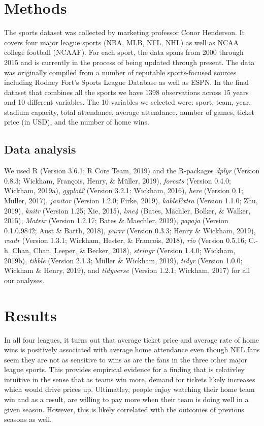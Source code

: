 \documentclass[man, fleqn, noextraspace,floatsintext]{apa6}
\begin{document}
\section{Methods}\label{methods}

The sports dataset was collected by marketing professor Conor Henderson.
It covers four major league sports (NBA, MLB, NFL, NHL) as well as NCAA
college football (NCAAF). For each sport, the data spans from 2000
through 2015 and is currently in the process of being updated through
present. The data was originally compiled from a number of reputable
sports-focused sources including Rodney Fort's Sports League Database as
well as ESPN. In the final dataset that combines all the sports we have
1398 observations across 15 years and 10 different variables. The 10
variables we selected were: sport, team, year, stadium capacity, total
attendance, average attendance, number of games, ticket price (in USD),
and the number of home wins.

\subsection{Data analysis}\label{data-analysis}

We used R (Version 3.6.1; R Core Team, 2019) and the R-packages
\emph{dplyr} (Version 0.8.3; Wickham, François, Henry, \& Müller, 2019),
\emph{forcats} (Version 0.4.0; Wickham, 2019a), \emph{ggplot2} (Version
3.2.1; Wickham, 2016), \emph{here} (Version 0.1; Müller, 2017),
\emph{janitor} (Version 1.2.0; Firke, 2019), \emph{kableExtra} (Version
1.1.0; Zhu, 2019), \emph{knitr} (Version 1.25; Xie, 2015), \emph{lme4}
(Bates, Mächler, Bolker, \& Walker, 2015), \emph{Matrix} (Version
1.2.17; Bates \& Maechler, 2019), \emph{papaja} (Version 0.1.0.9842;
Aust \& Barth, 2018), \emph{purrr} (Version 0.3.3; Henry \& Wickham,
2019), \emph{readr} (Version 1.3.1; Wickham, Hester, \& Francois, 2018),
\emph{rio} (Version 0.5.16; C.-h. Chan, Chan, Leeper, \& Becker, 2018),
\emph{stringr} (Version 1.4.0; Wickham, 2019b), \emph{tibble} (Version
2.1.3; Müller \& Wickham, 2019), \emph{tidyr} (Version 1.0.0; Wickham \&
Henry, 2019), and \emph{tidyverse} (Version 1.2.1; Wickham, 2017) for
all our analyses.

\section{Results}\label{results}

In all four leagues, it turns out that average ticket price and average
rate of home wins is positively associated with average home attendance
even though NFL fans seem they are not as sensitive to wins as are the
fans in the three other major league sports. This provides empirical
evidence for a finding that is relativley intuitive in the sense that as
teams win more, demand for tickets likely increases which would drive
prices up. Ultimatley, people enjoy watching their home team win and as
a result, are willing to pay more when their team is doing well in a
given season. However, this is likely correlated with the outcomes of
previous seasons as well.
\end{document}

